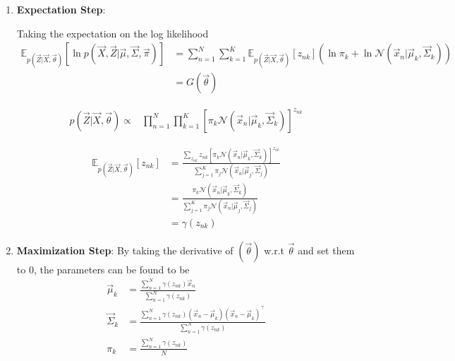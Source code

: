 \documentclass[12pt,twoside]{article}
\begin{document}
\begin{enumerate}
\item \textbf{Expectation Step}:

Taking the expectation on the log likelihood 
\begin{align*}
\mathbb{E}_{p(\vec{Z}\vert \vec{X}, \vec{\theta})}\left[\ln p(\vec{X}, \vec{Z}\vert \vec{\mu}, \vec{\Sigma}, \vec{\pi})\right]
& =\sum_{n=1}^{N}\sum_{k=1}^{K} \mathbb{E}_{p(\vec{Z}\vert \vec{X}, \vec{\theta})}[z_{nk}]\left(\ln \pi_k + \ln \mathcal{N}(\vec{x}_n\vert \vec{\mu}_k, \vec{\Sigma}_k)\right)\\
& = G(\vec{\theta})
\end{align*}

\begin{align*}
p(\vec{Z}\vert \vec{X}, \vec{\theta})\propto &
\prod_{n=1}^N\prod_{k=1}^K [\pi_k\mathcal{N}(\vec{x}_n\vert \vec{\mu}_k, \vec{\Sigma}_k)]^{z_{nk}}
\end{align*}

\begin{align*}
\mathbb{E}_{p(\vec{Z}\vert \vec{X}, \vec{\theta})}[z_{nk}]
&= \frac{\sum_{z_{nk}}z_{nk}[\pi_k\mathcal{N}(\vec{x}_n\vert \vec{\mu}_k, \vec{\Sigma}_k)]^{z_{nk}} }{\sum_{j=1}^K \pi_j \mathcal{N}(\vec{x}_n \vert \vec{\mu}_j, \vec{\Sigma}_j)}\\
&= \frac{\pi_k \mathcal{N}(\vec{x}_n \vert \vec{\mu}_k, \vec{\Sigma}_k)}{\sum_{j=1}^K \pi_j \mathcal{N}(\vec{x}_n \vert \vec{\mu}_j, \vec{\Sigma}_j)}\\
&=\gamma({z_{nk}})
\end{align*}

\item \textbf{Maximization Step}:
By taking the derivative of $(\vec{\theta})$ w.r.t $\vec{\theta}$ and set them to $0$, the parameters can be found to be
\begin{align*}
	\vec{\mu}_k & = \frac{\sum_{n=1}^N \gamma(z_{nk})\vec{x}_n}{\sum_{n=1}^N \gamma(z_{nk})}\\
	\vec{\Sigma}_k& = \frac{\sum_{n=1}^N \gamma(z_{nk})(\vec{x}_n-\vec{\mu}_k)(\vec{x}_n-\vec{\mu}_k)^\top}{\sum_{n=1}^N \gamma(z_{nk})}\\
	\pi_k&= \frac{\sum_{n=1}^N \gamma(z_{nk})}{N}
\end{align*}

\end{enumerate}
\end{document}

